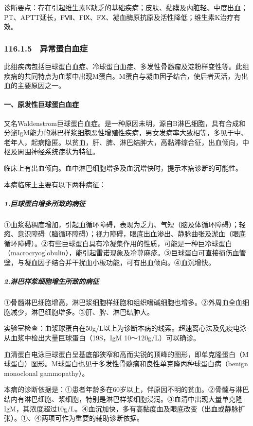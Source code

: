 诊断要点：存在引起维生素K缺乏的基础疾病；皮肤、黏膜及内脏轻、中度出血；PT、APTT延长，FⅦ、FⅨ、FⅩ、凝血酶原抗原及活性降低；维生素K治疗有效。

\subsubsection{116.1.5　异常蛋白血症}

此组疾病包括巨球蛋白血症、冷球蛋白血症、多发性骨髓瘤及淀粉样变性等。此组疾病的共同特点为血浆中出现M蛋白。M蛋白与凝血因子结合，使后者灭活，为出血的主要原因之一。

\paragraph{一、原发性巨球蛋白血症}

又名Waldenstrom巨球蛋白血症。是一种原因未明，源自B淋巴细胞，具有合成和分泌IgM能力的淋巴样浆细胞恶性增殖性疾病，男女发病率大致相等，多见于中、老年人，起病隐匿。以贫血，肝、脾、淋巴结肿大，高黏滞综合征，出血倾向，中枢及周围神经系统症状为特征。

临床上有出血倾向。血中淋巴细胞增多及血沉增快时，提示本病诊断的可能性。

本病临床上主要有以下两种病征：

\subparagraph{1.巨球蛋白增多所致的病征}

①血浆黏稠度增加，引起血循环障碍，表现为乏力、气短（脑及体循环障碍）；轻瘫、意识障碍（脑循环障碍）；视力障碍，眼底出血渗出、静脉曲张及淤血（眼底循环障碍）。②有些巨球蛋白具有冷凝集作用的性质，可能是一种巨冷球蛋白（macrocryoglobulin），能引起雷诺现象及冷荨麻疹。③巨球蛋白可直接损伤血管壁，与凝血因子结合并干扰血小板功能，可有出血倾向。④血沉增快。

\subparagraph{2.淋巴样浆细胞增生所致的病征}

①骨髓淋巴细胞增高，淋巴浆细胞样细胞和组织嗜碱细胞也增多。②外周血全血细胞减少，淋巴细胞增多。③肝、脾、淋巴结肿大。

实验室检查：血浆球蛋白在50g/L以上为诊断本病的线索。超速离心法及免疫电泳从血浆中检出大量巨球蛋白（19S，IgM
10～120g/L）可以确诊。

血清蛋白电泳巨球蛋白呈基底部狭窄和高而尖锐的顶峰的图形，即单克隆蛋白（M球蛋白）图形。M球蛋白也见于多发性骨髓瘤和良性单克隆丙种球蛋白病（benign
monoclonal gammopathy）。

本病的诊断依据是：①患者年龄多在60岁以上，伴原因不明的贫血。②骨髓与淋巴结内有淋巴细胞、浆细胞，特别是淋巴样浆细胞浸润。③血清中出现大量单克隆IgM，其浓度超过10g/L。④血沉加快，多有高黏度血及眼底改变（出血或静脉扩张）。①、④两项可作为重要的辅助诊断依据。

